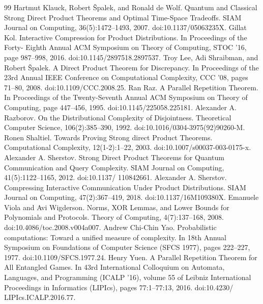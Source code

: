 \begin{thebibliography}{99}
 Hartmut Klauck, Robert Špalek, and Ronald de Wolf. Quantum and Classical Strong Direct Product Theorems and Optimal Time-Space Tradeoffs. SIAM Journal on Computing, 36(5):1472–1493, 2007. doi:10.1137/05063235X.
 Gillat Kol. Interactive Compression for Product Distributions. In Proceedings of the Forty- Eighth Annual ACM Symposium on Theory of Computing, STOC ’16, page 987–998, 2016. doi:10.1145/2897518.2897537.
 Troy Lee, Adi Shraibman, and Robert Špalek. A Direct Product Theorem for Discrepancy. In Proceedings of the 23rd Annual IEEE Conference on Computational Complexity, CCC ’08, pages 71–80, 2008. doi:10.1109/CCC.2008.25.
 Ran Raz. A Parallel Repetition Theorem. In Proceedings of the Twenty-Seventh Annual ACM Symposium on Theory of Computing, page 447–456, 1995. doi:10.1145/225058.225181.
 Alexander A. Razborov. On the Distributional Complexity of Disjointness. Theoretical Computer Science, 106(2):385–390, 1992. doi:10.1016/0304-3975(92)90260-M.
 Ronen Shaltiel. Towards Proving Strong direct Product Theorems. Computational Complexity, 12(1-2):1–22, 2003. doi:10.1007/s00037-003-0175-x.
 Alexander A. Sherstov. Strong Direct Product Theorems for Quantum Communication and Query Complexity. SIAM Journal on Computing, 41(5):1122–1165, 2012. doi:10.1137/ 110842661.
 Alexander A. Sherstov. Compressing Interactive Communication Under Product Distributions. SIAM Journal on Computing, 47(2):367–419, 2018. doi:10.1137/16M109380X.
 Emanuele Viola and Avi Wigderson. Norms, XOR Lemmas, and Lower Bounds for Polynomials and Protocols. Theory of Computing, 4(7):137–168, 2008. doi:10.4086/toc.2008.v004a007.
 Andrew Chi-Chin Yao. Probabilistic computations: Toward a unified measure of complexity. In 18th Annual Symposium on Foundations of Computer Science (SFCS 1977), pages 222–227, 1977. doi:10.1109/SFCS.1977.24.
 Henry Yuen. A Parallel Repetition Theorem for All Entangled Games. In 43rd International Colloquium on Automata, Languages, and Programming (ICALP ’16), volume 55 of Leibniz International Proceedings in Informatics (LIPIcs), pages 77:1–77:13, 2016. doi:10.4230/ LIPIcs.ICALP.2016.77.
\end{thebibliography}
